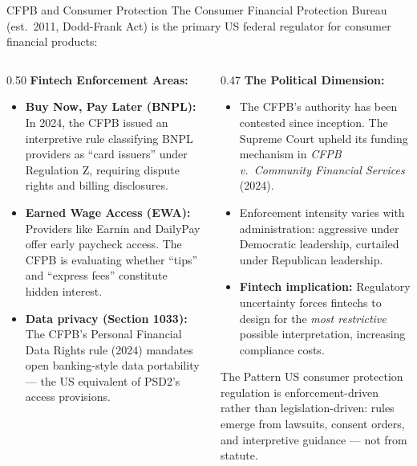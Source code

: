 \begin{frame}{CFPB and Consumer Protection}
  The Consumer Financial Protection Bureau (est.\ 2011, Dodd-Frank Act) is the
  primary US federal regulator for consumer financial products:

  \vspace{0.5em}
  \begin{columns}[T]
    \begin{column}{0.50\textwidth}
      \textcolor{mlpurple}{\textbf{Fintech Enforcement Areas:}}
      \begin{itemize}
        \item \textbf{Buy Now, Pay Later (BNPL):} In 2024, the CFPB issued an
              interpretive rule classifying BNPL providers as ``card issuers''
              under Regulation Z, requiring dispute rights and billing
              disclosures.
        \item \textbf{Earned Wage Access (EWA):} Providers like Earnin and
              DailyPay offer early paycheck access. The CFPB is evaluating
              whether ``tips'' and ``express fees'' constitute hidden interest.
        \item \textbf{Data privacy (Section 1033):} The CFPB's Personal
              Financial Data Rights rule (2024) mandates open banking-style
              data portability --- the US equivalent of PSD2's access provisions.
      \end{itemize}
    \end{column}
    \begin{column}{0.47\textwidth}
      \textcolor{mlpurple}{\textbf{The Political Dimension:}}
      \begin{itemize}
        \item The CFPB's authority has been contested since inception. The
              Supreme Court upheld its funding mechanism in
              \textit{CFPB v.\ Community Financial Services} (2024).
        \item Enforcement intensity varies with administration: aggressive
              under Democratic leadership, curtailed under Republican
              leadership.
        \item \textbf{Fintech implication:} Regulatory uncertainty forces
              fintechs to design for the \textit{most restrictive} possible
              interpretation, increasing compliance costs.
      \end{itemize}

      \vspace{0.3em}
      \begin{alertblock}{The Pattern}
        US consumer protection regulation is \textcolor{mlred}{enforcement-driven
        rather than legislation-driven}: rules emerge from lawsuits, consent
        orders, and interpretive guidance --- not from statute.
      \end{alertblock}
    \end{column}
  \end{columns}
\end{frame}

